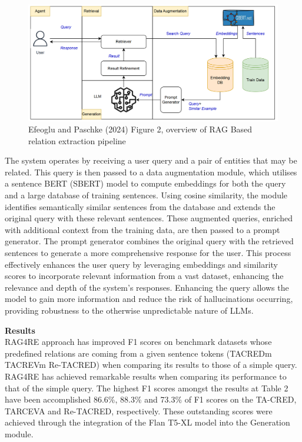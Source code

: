 \documentclass[twocolumn, 11pt]{extarticle}
\begin{document}
\begin{figure}
    \centering
    \includegraphics[width=1\linewidth]{RAG4RE_pipeline.png}
    \caption{Efeoglu and Paschke (2024) Figure 2, overview of RAG Based relation extraction pipeline }
    \label{RAG4RE Framework}
\end{figure}

The system operates by receiving a user query and a pair of entities that may be related. This query is then passed to a data augmentation module, which utilises a sentence BERT (SBERT) model to compute embeddings for both the query and a large database of training sentences. Using cosine similarity, the module identifies semantically similar sentences from the database and extends the original query with these relevant sentences. These augmented queries, enriched with additional context from the training data, are then passed to a prompt generator. The prompt generator combines the original query with the retrieved sentences to generate a more comprehensive response for the user. This process effectively enhances the user query by leveraging embeddings and similarity scores to incorporate relevant information from a vast dataset, enhancing the relevance and depth of the system's responses. Enhancing the query allows the model to gain more information and reduce the risk of hallucinations occurring, providing robustness to the otherwise unpredictable nature of LLMs. 

\textbf{Results} \\
RAG4RE approach has improved F1 scores on benchmark datasets whose predefined relations are coming from a given sentence tokens (TACREDm TACREVm Re-TACRED) when comparing its results to those of a simple query. RAG4RE has achieved remarkable results when comparing its performance to that of the simple query. The highest F1 scores amongst the results at Table 2 have been accomplished 86.6\%, 88.3\% and 73.3\% of F1 scores on the TA-CRED, TARCEVA and Re-TACRED, respectively. These outstanding scores were achieved through the integration of the Flan T5-XL model into the Generation module.
\end{document}
